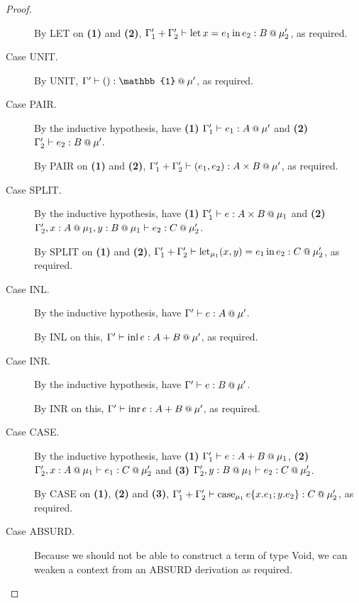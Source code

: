 \documentclass[acmsmall,screen,nonacm]{acmart}
\makeatletter
\DeclareMathOperator{\llet}{\text{let}}
\DeclareMathOperator{\lin}{\text{in}}
\DeclareMathOperator{\case}{\text{case}}
\newcommand{\at}{\mathbin{\mbox{\small\ensuremath{@}}}}
\newcommand{\unit}{\mathbb{1}}
\DeclareMathOperator{\inl}{\text{inl}}
\DeclareMathOperator{\inr}{\text{inr}}
\newcommand{\tee}{\vdash}
\makeatother
\begin{document}
\begin{proof}
\begin{description}
    By LET on \textbf{(1)} and \textbf{(2)}, $\Gamma^\prime_1 + \Gamma^\prime_2 \tee \llet x = e_1 \lin e_2 : B \at \mu_2^\prime$, as required.
    \\
    \item[Case UNIT.]
    By UNIT, $\Gamma^\prime \tee () : \unit \at \mu^\prime$, as required.
    \\
    \item[Case PAIR.]
    By the inductive hypothesis, have \textbf{(1)} $\Gamma^\prime_1 \tee e_1 : A \at \mu^\prime$ and \textbf{(2)} $\Gamma^\prime_2 \tee e_2 : B \at \mu^\prime.$
    
    By PAIR on \textbf{(1)} and \textbf{(2)}, $\Gamma^\prime_1 + \Gamma^\prime_2 \tee (e_1, e_2) : A \times B \at \mu^\prime$, as required.
    \\
    \item[Case SPLIT.]
    By the inductive hypothesis, have \textbf{(1)} $\Gamma^\prime_1 \tee e : A \times B \at \mu_1$ and \textbf{(2)} $\Gamma^\prime_2, x : A \at \mu_1, y : B \at \mu_1 \tee e_2 : C \at \mu_2^\prime$.
    
    By SPLIT on \textbf{(1)} and \textbf{(2)}, $\Gamma^\prime_1 + \Gamma^\prime_2 \tee \llet_{\mu_1} (x, y) = e_1 \lin e_2 : C \at \mu_2^\prime$, as required.
    \\
    \item[Case INL.]
    By the inductive hypothesis, have $\Gamma^\prime \tee e : A \at \mu^\prime$.
    
    By INL on this, $\Gamma^\prime \tee \inl e : A + B \at \mu^\prime$, as required.
    \\
    \item[Case INR.]
    By the inductive hypothesis, have $\Gamma^\prime \tee e : B \at \mu^\prime$.
    
    By INR on this, $\Gamma^\prime \tee \inr e : A + B \at \mu^\prime$, as required.
    \\
    \item[Case CASE.]
    By the inductive hypothesis, have \textbf{(1)} $\Gamma^\prime_1 \tee e : A + B \at \mu_1$, \textbf{(2)} $\Gamma^\prime_2, x : A \at \mu_1 \tee e_1 : C \at \mu_2^\prime$ and \textbf{(3)} $\Gamma^\prime_2, y : B \at \mu_1 \tee e_2 : C \at \mu_2^\prime$.
    
    By CASE on \textbf{(1)}, \textbf{(2)} and \textbf{(3)}, $\Gamma^\prime_1 + \Gamma^\prime_2 \tee \case_{\mu_1} e \{x.e_1; y.e_2\} : C \at \mu_2^\prime$, as required.
    \\
    \item[Case ABSURD.]
    Because we should not be able to construct a term of type Void, we can weaken a context from an ABSURD derivation as required.
  \end{description}
\end{proof}
\end{document}
